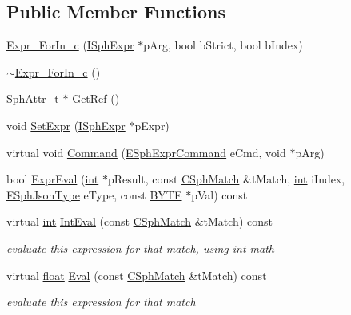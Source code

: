 \subsection*{Public Member Functions}
\begin{DoxyCompactItemize}
\item 
\hyperlink{structExpr__ForIn__c_ac4c66385092b16730a4d202ab50cabec}{Expr\-\_\-\-For\-In\-\_\-c} (\hyperlink{structISphExpr}{I\-Sph\-Expr} $\ast$p\-Arg, bool b\-Strict, bool b\-Index)
\item 
\hyperlink{structExpr__ForIn__c_a385918ba314ffcc41dc4ffea2b08969c}{$\sim$\-Expr\-\_\-\-For\-In\-\_\-c} ()
\item 
\hyperlink{sphinx_8h_a7c122d91b0b52a0214ba176636bb1561}{Sph\-Attr\-\_\-t} $\ast$ \hyperlink{structExpr__ForIn__c_aec46ce56bdee820d7295d9179d875582}{Get\-Ref} ()
\item 
void \hyperlink{structExpr__ForIn__c_ad4b64d638280ecd4f49c8d2d65230468}{Set\-Expr} (\hyperlink{structISphExpr}{I\-Sph\-Expr} $\ast$p\-Expr)
\item 
virtual void \hyperlink{structExpr__ForIn__c_a3a174b5505fd39c3718ee041e3354279}{Command} (\hyperlink{sphinxexpr_8h_a30be184fb07bd80c271360fc6094c818}{E\-Sph\-Expr\-Command} e\-Cmd, void $\ast$p\-Arg)
\item 
bool \hyperlink{structExpr__ForIn__c_ab44521c2171561af0a20d65059fb839a}{Expr\-Eval} (\hyperlink{sphinxexpr_8cpp_a4a26e8f9cb8b736e0c4cbf4d16de985e}{int} $\ast$p\-Result, const \hyperlink{classCSphMatch}{C\-Sph\-Match} \&t\-Match, \hyperlink{sphinxexpr_8cpp_a4a26e8f9cb8b736e0c4cbf4d16de985e}{int} i\-Index, \hyperlink{sphinxjson_8h_ad0338b1aabded682906629a3e477a2a8}{E\-Sph\-Json\-Type} e\-Type, const \hyperlink{sphinxstd_8h_a4ae1dab0fb4b072a66584546209e7d58}{B\-Y\-T\-E} $\ast$p\-Val) const 
\item 
virtual \hyperlink{sphinxexpr_8cpp_a4a26e8f9cb8b736e0c4cbf4d16de985e}{int} \hyperlink{structExpr__ForIn__c_a95a18ccf1841cfbc874ba630ad1f4c82}{Int\-Eval} (const \hyperlink{classCSphMatch}{C\-Sph\-Match} \&t\-Match) const 
\begin{DoxyCompactList}\small\item\em evaluate this expression for that match, using int math \end{DoxyCompactList}\item 
virtual \hyperlink{sphinxexpr_8cpp_a0e0d0739f7035f18f949c2db2c6759ec}{float} \hyperlink{structExpr__ForIn__c_aad604ee137061ece5e01dd642caa66c3}{Eval} (const \hyperlink{classCSphMatch}{C\-Sph\-Match} \&t\-Match) const 
\begin{DoxyCompactList}\small\item\em evaluate this expression for that match \end{DoxyCompactList}\item 

\end{DoxyCompactItemize}
